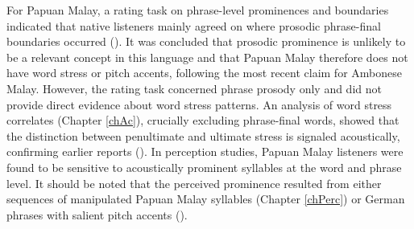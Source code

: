 For Papuan Malay, a rating task on phrase-level prominences and boundaries indicated that native listeners mainly agreed on where prosodic phrase-final boundaries occurred (\citealt{riesberg_perception_2018}). It was concluded that prosodic prominence is unlikely to be a relevant concept in this language and that Papuan Malay therefore does not have word stress or pitch accents, following the most recent claim for Ambonese Malay. However, the rating task concerned phrase prosody only and did not provide direct evidence about word stress patterns. An analysis of word stress correlates (Chapter \ref{chAc}), crucially excluding phrase-final words, showed that the distinction between penultimate and ultimate stress is signaled acoustically, confirming earlier reports (\citealt{kluge_grammar_2017}). In perception studies, Papuan Malay listeners were found to be sensitive to acoustically prominent syllables at the word and phrase level. It should be noted that the perceived prominence resulted from either sequences of manipulated Papuan Malay syllables (Chapter \ref{chPerc}) or German phrases with salient pitch accents (\citealt{riesberg_using_2020}).\par

